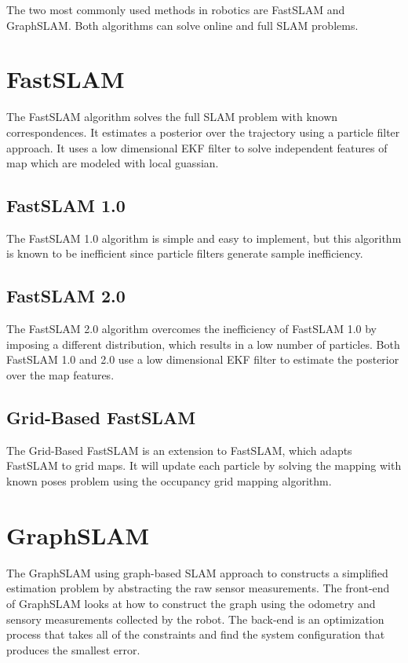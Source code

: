 \documentclass[10pt,journal,compsoc]{IEEEtran}
\begin{document}
The two most commonly used methods in robotics are FastSLAM and GraphSLAM. Both algorithms can solve online and full SLAM problems.

\section{FastSLAM}
The FastSLAM algorithm solves the full SLAM problem with known correspondences. It estimates a posterior over the trajectory using a particle filter approach. It uses a low dimensional EKF filter to solve independent features of map which are modeled with local guassian.

\subsection{FastSLAM 1.0}
The FastSLAM 1.0 algorithm is simple and easy to implement, but this algorithm is known to be inefficient since particle filters generate sample inefficiency.

\subsection{FastSLAM 2.0}
The FastSLAM 2.0 algorithm overcomes the inefficiency of FastSLAM 1.0 by imposing a different distribution, which results in a low number of particles. Both FastSLAM 1.0 and 2.0 use a low dimensional EKF filter to estimate the posterior over the map features.

\subsection{Grid-Based FastSLAM}
The Grid-Based FastSLAM is an extension to FastSLAM, which adapts FastSLAM to grid maps. It will update each particle by solving the mapping with known poses problem using the occupancy grid mapping algorithm.

\section{GraphSLAM}
The GraphSLAM using graph-based SLAM approach to constructs a simplified estimation problem by abstracting the raw sensor measurements. The front-end of GraphSLAM looks at how to construct the graph using the odometry and sensory measurements collected by the robot. The back-end is an optimization process that takes all of the constraints and find the system configuration that produces the smallest error.
\end{document}
